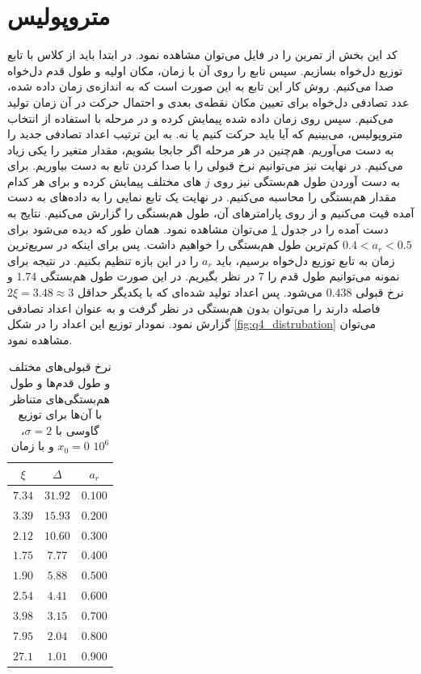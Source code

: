 \documentclass[11pt, a4paper]{article}
\begin{document}
\section{\textbf{متروپولیس}}
کد این بخش از تمرین را در فایل
می‌توان مشاهده نمود.
در ابتدا باید
از کلاس
با تابع توزیع دل‌خواه بسازیم.
سپس تابع
را روی آن با زمان، مکان اولیه و طول قدم دل‌خواه صدا می‌کنیم.
روش کار این تابع به این صورت است که به اندازه‌ی زمان داده شده، 
عدد تصادفی دل‌خواه برای تعیین مکان نقطه‌ی بعدی و احتمال حرکت در آن زمان تولید می‌کنیم.
سپس روی زمان داده شده پیمایش کرده و در مرحله با استفاده از انتخاب متروپولیس، می‌بینیم که آیا باید حرکت کنیم یا نه.
به این ترتیب اعداد تصادفی جدید را به دست می‌آوریم.
هم‌چنین در هر مرحله اگر جابجا بشویم، مقدار متغیر
را یکی زیاد می‌کنیم.
در نهایت نیز می‌توانیم نرخ قبولی را با صدا کردن تابع
به دست بیاوریم.
برای به دست آوردن طول هم‌بستگی نیز روی
$j$
های مختلف پیمایش کرده و برای هر کدام مقدار هم‌بستگی را محاسبه می‌کنیم.
در نهایت یک تابع نمایی را به داده‌‌های به دست آمده فیت می‌کنیم و از روی پارامتر‌های آن، طول هم‌بستگی را گزارش می‌کنیم.
نتایج به دست آمده را در جدول
\ref{tab:q4_l}
می‌توان مشاهده نمود.
همان طور که دیده می‌شود برای
$0.4 < a_r < 0.5$
کم‌ترین طول هم‌بستگی را خواهیم داشت.
پس برای اینکه در سریع‌ترین زمان به تابع توزیع دل‌خواه برسیم،
باید
$a_r$
را در این بازه تنظیم بکنیم.
در نتیجه برای نمونه می‌توانیم طول قدم‌ را
$7$
در نظر بگیریم.
در این صورت طول هم‌بستگی
$1.74$
و نرخ قبولی
$0.438$
می‌شود. پس اعداد تولید شده‌ای که با یکدیگر حداقل
$2\xi = 3.48 \approx 3$
فاصله دارند را می‌توان بدون هم‌بستگی در نظر گرفت و به عنوان اعداد تصادفی گزارش نمود.
نمودار توزیع این اعداد را در شکل‌
\ref{fig:q4_distrubation}
می‌توان مشاهده نمود.

\begin{table}[h!]
  \centering
  \begin{tabular}{|c|c|c|}
    \hline
    $\xi$ & $\Delta$ & $a_r$ \\ \hline
    $7.34$ & $31.92$ & $0.100$ \\ \hline
    $3.39$ & $15.93$ & $0.200$ \\ \hline
    $2.12$ & $10.60$ & $0.300$ \\ \hline
    $1.75$ & $7.77$ & $0.400$ \\ \hline
    $1.90$ & $5.88$ & $0.500$ \\ \hline
    $2.54$ & $4.41$ & $0.600$ \\ \hline
    $3.98$ & $3.15$ & $0.700$ \\ \hline
    $7.95$ & $2.04$ & $0.800$ \\ \hline
    $27.1$ & $1.01$ & $0.900$ \\ \hline
  \end{tabular}
  \caption{نرخ قبولی‌های مختلف و طول قدم‌ها و طول هم‌بستگی‌های متناظر با آن‌ها برای توزیع گاوسی با $\sigma = 2$، $x_0 = 0$ و با زمان $10^6$}
  \label{tab:q4_l}
\end{table}
\end{document}
